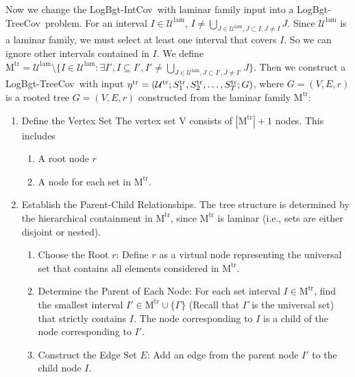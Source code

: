 \documentclass[11pt,a4paper]{article} \usepackage{enumitem}
\newcommand{\calU}{\mathcal{U}}
\newcommand{\LBOintcov}{\textsf{LogBgt-IntCov}}
\newcommand{\LBOtreecov}{\textsf{LogBgt-TreeCov}}
\newcommand{\trU}{\operatorname{\calU^{tr}}}
\newcommand{\trS}[1]{\ifx\relax#1\relax
    S^{\operatorname{tr}} \else
    S^{\operatorname{tr}}_{#1} \fi
}
\newcommand{\treta}{\operatorname{\eta^{tr}}}
\newcommand{\trM}{\operatorname{M^{tr}}}
\newcommand{\lamU}{\operatorname{\calU^{lam}}}
\theoremstyle{definition}
\begin{document}
Now we change the \LBOintcov\ with laminar family input into a \LBOtreecov\ problem.
For an interval $I\in \lamU$, $I\not =\bigcup_{J\in \lamU, J\subset I,J\not =I} J$. Since $\lamU$ is a laminar family, we must select at least one interval that covers $I$. So we can ignore other intervals contained in $I$.
We define
$\trM = \lamU\setminus \{I \in \lamU: \exists I', I\subseteq I', I' \neq \bigcup_{J \in \lamU, J \subset I', J\not =I'} J\}$.   
Then we construct a \LBOtreecov\ with input $\treta=(\trU; \trS{1}, \trS{2}, \ldots, \trS{T}; G)$, where $G=(V,E,r)$ is a rooted tree $G=(V,E,r)$ constructed from the laminar family $\trM$:

\begin{enumerate}
    \item Define the Vertex Set The vertex set V consists of $|\trM|+1$ nodes. This includes 
    \begin{enumerate}
        \item A root node $r$ 
        \item A node for each set in $\trM$.
    \end{enumerate}
    \item Establish the Parent-Child Relationships. The tree structure is determined by the hierarchical containment in $\trM$, since $\trM$ is laminar (i.e., sets are either disjoint or nested).
    \begin{enumerate}
    \item Choose the Root $r$: Define $r$ as a virtual node representing the universal set that contains all elements considered in $\trM$.
    \item Determine the Parent of Each Node: For each set interval $I\in \trM$, find the smallest interval $I'\in \trM\cup \lbrace \Gamma\rbrace$ (Recall that $\Gamma$ is the universal set) that strictly contains $I$. The node corresponding to $I$ is a child of the node corresponding to $I'$.
    \item Construct the Edge Set $E$: Add an edge from the parent node $I'$ to the child node $I$.
    \end{enumerate}
\end{enumerate}
\end{document}
